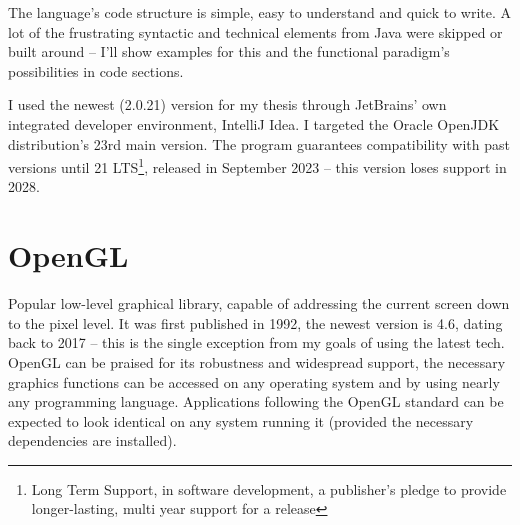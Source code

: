 The language's code structure is simple, easy to understand and quick to write. A lot of the frustrating syntactic and technical elements from Java were skipped or built around -- I'll show examples for this and the functional paradigm's possibilities in code sections.


I used the newest (2.0.21) version for my thesis through JetBrains' own integrated developer environment, IntelliJ Idea. I targeted the Oracle OpenJDK distribution's 23rd main version. The program guarantees compatibility with past versions until 21 LTS\footnote{Long Term Support, in software development, a publisher's pledge to provide longer-lasting, multi year support for a release}, released in September 2023 -- this version loses support in 2028.~\cite{JavaRoadmap}

\section{OpenGL }

Popular low-level graphical library, capable of addressing the current screen down to the pixel level. It was first published in 1992, the newest version is 4.6, dating back to 2017 -- this is the single exception from my goals of using the latest tech.~\cite{OpenglHistory} OpenGL can be praised for its robustness and widespread support, the necessary graphics functions can be accessed on any operating system and by using nearly any programming language. Applications following the OpenGL standard can be expected to look identical on any system running it (provided the necessary dependencies are installed).

